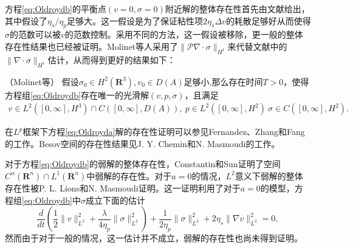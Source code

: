 方程\eqref{eq:Oldroydb}的平衡点$(v=0,\sigma=0)$附近解的整体存在性首先由文献\cite{guillope1990existence}给出，其中假设了$\eta_s/\eta_p$足够大。这一假设是为了保证粘性项$ 2 \eta_s \Delta v$的耗散足够好从而使得$\sigma$的范数可以被$v$的范数控制。采用不同的方法，这一假设被移除，更一般的整体存在性结果也已经被证明\cite{chupin2004some,molinet2004global,molinet2004existence}。Molinet等人采用了$\|\mathcal{P}\nabla \cdot \sigma\|_{H^1}$来代替文献\cite{guillope1990existence}中的$\|\nabla \cdot \sigma\|_{H^1}$估计，从而得到更好的结果如下\cite{molinet2004global,molinet2004existence}：
\begin{theorem}（Molinet等\cite{molinet2004existence}）
	假设$\sigma_0 \in H^2(\mathbf{R}^3),v_0 \in D(A)$足够小,那么存在时间$T>0$，使得方程组\eqref{eq:Oldroydb}存在唯一的光滑解$(v,p,\sigma)$，且满足
	\begin{eqnarray*}
		v \in L^2([0,\infty],H^3) \cap C([0,\infty],D(A)), \ p \in L^2([0,\infty],H^2) \ \sigma \in C([0,\infty],H^2).
	\end{eqnarray*}
\end{theorem}

在$L^p$框架下方程\eqref{eq:Oldroyda}解的存在性证明可以参见Fernandez、Zhang和Fang的工作\cite{fernandez1998some,zhang2012global}。Besov空间的存在性结果见J. Y. Chemin和N. Masmoudi的工作\cite{chemin2001lifespan}。

对于方程\eqref{eq:Oldroydb}的弱解的整体存在性，Constantin和Sun证明了空间$C^\alpha(\mathbf{R}^n) \cap L^1(\mathbf{R}^n)$中弱解的存在性\cite{constantin2010remarks,saut2012lectures}。对于$a=0$的情况，$L^2$意义下弱解的整体存在性被P. L. Lions和N. Masmoudi证明\cite{lions2000global}。这一证明利用了对于$a=0$的模型，方程组\eqref{eq:Oldroydb}中$\sigma$成立下面的估计
\begin{equation*}
	\frac{d}{dt} \left(\frac{1}{2} \|v\|_{L^2}^2 +  \frac{\lambda}{4 \eta_p} \|\sigma\|_{L^2}^2 \right) + \frac{1}{2\eta_p} \|\sigma\|_{L^2}^2 + {2 \eta_s} \|\nabla v\|_{L^2}^2 = 0,
\end{equation*}
然而由于对于一般的情况，这一估计并不成立，弱解的存在性也尚未得到证明\cite{saut2012lectures}。

